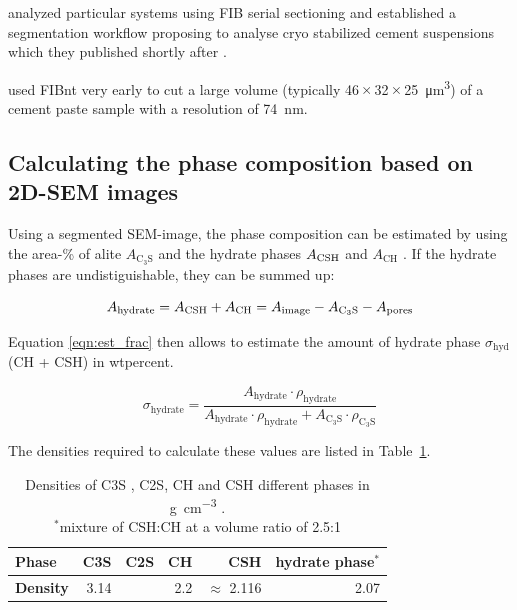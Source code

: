 \cite{holzer.2006, munch.2006} analyzed particular systems using \ac{FIB} serial sectioning and established a segmentation workflow proposing to analyse cryo stabilized cement suspensions which they published shortly after \textcite{holzer.2007}.

\textcite{holzer.2006a} used \ac{FIBnt} very early to cut a large volume (typically \num{46}\,$\times$\,\num{32}\,$\times$\,\SI{25}{\cubic\micro\meter}) of a cement paste sample with a resolution of \SI{74}{\nano\meter}.



\subsection{Calculating the phase composition based on 2D-SEM images}

Using a segmented \ac{SEM}-image, the phase composition can be estimated by using the area-\% of alite $A_{\text{C}_3\text{S}}$ and the hydrate phases $A_\text{\text{CSH}}$ and $A_\text{CH}$ \cite{kleiner.2024a}.
If the hydrate phases are undistiguishable, they can be summed up:

\begin{equation}
	\label{eqn:est_hydrate_area}
	A_\text{hydrate} = A_\text{\text{CSH}} + A_\text{CH} = A_{\text{image}} - A_{\text{C}_3\text{S}} - A_{\text{pores}}
\end{equation}

Equation \eqref{eqn:est_frac} then allows to estimate the amount of hydrate phase $\sigma_\text{hyd}$ (\ac{CH} + \ac{CSH}) in \si{wtpercent}.

\begin{equation}
	\label{eqn:est_frac}
	\sigma_\text{hydrate} = \frac{A_\text{hydrate} \cdot \rho_\text{hydrate}}{A_\text{hydrate} \cdot \rho_\text{hydrate} + A_{\text{C}_3\text{S}} \cdot \rho_{\text{C}_3\text{S}}}
\end{equation}

The densities required to calculate these values are listed in Table~\ref{tab:densities}.

\begin{table}[htb]
    \centering
    \caption{Densities of \ac{C3S} \cite{garrault.2006}, \ac{C2S}, \ac{CH} and \ac{CSH} \cite{garrault.2006} different phases in \si{\gram\per\cubic\centi\meter} \cite{jennings.2000,garrault.2006}.\\$^{*}$mixture of \ac{CSH}:\ac{CH} at a volume ratio of 2.5:1}
    \label{tab:densities}
    \begin{tabular}{@{}lrrrrr@{}}
        \toprule
        \textbf{Phase} & \ac{C3S} & \ac{C2S} & \ac{CH} & \ac{CSH} & hydrate phase$^{*}$\\
		\midrule
        \textbf{Density} & 3.14 & & 2.2 & $\approx$ 2.116 &  2.07\\
		\bottomrule
    \end{tabular}
\end{table}


